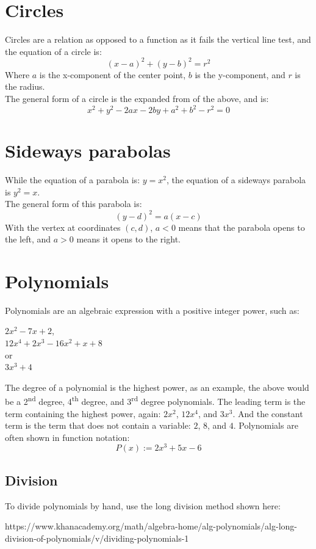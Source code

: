 \documentclass{report}
\begin{document}
\section{Circles}
Circles are a relation as opposed to a function as it fails the vertical line test, and the equation of a circle is:
$$
	(x - a)^2 + (y - b)^2 = r^2
$$
Where $a$ is the x-component of the center point,  $b$ is the y-component, and $r$ is the radius.\\

The general form of a circle is the expanded from of the above, and is:
$$
	x^2 + y^2 - 2ax - 2by + a^2 + b^2 -r^2 = 0
$$

\section{Sideways parabolas}
While the equation of a parabola is: $y = x^2$, the equation of a sideways parabola is $y^2 = x$.\\

The general form of this parabola is:
$$
	(y - d)^2 = a(x - c)
$$
With the vertex at coordinates $(c, d)$, $a < 0$ means that the parabola opens to the left, and $a > 0$ means it opens to the right.

\section{Polynomials}
Polynomials are an algebraic expression with a positive integer power, such as:
\begin{center}
	$2x^2 - 7x + 2$,\\
	$12x^4 + 2x^3 - 16x^2 + x + 8$\\
	or\\
	$3x^3 + 4$
\end{center}
The degree of a polynomial is the highest power, as an example, the above would be a 2\textsuperscript{nd} degree, 4\textsuperscript{th} degree, and 3\textsuperscript{rd} degree polynomials.  The leading term is the term containing the highest power, again: $2x^2$, $12x^4$, and $3x^3$.  And the constant term is the term that does not contain a variable: $2$, $8$, and $4$.  Polynomials are often shown in function notation:
$$
	P(x) := 2x^3 + 5x - 6
$$

\subsection{Division}
To divide polynomials by hand, use the long division method shown here:
\begin{center}
	https://www.khanacademy.org/math/algebra-home/alg-polynomials/alg-long-division-of-polynomials/v/dividing-polynomials-1
\end{center}
\end{document}
